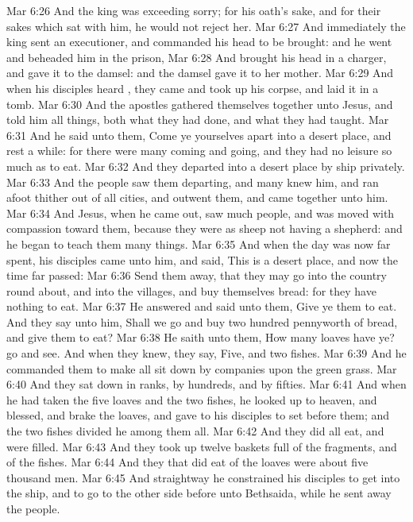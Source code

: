 \vs Mar 6:26 And the king was exceeding sorry;  for his oath's sake, and for their sakes which sat with him, he would not reject her.
\vs Mar 6:27 And immediately the king sent an executioner, and commanded his head to be brought: and he went and beheaded him in the prison,
\vs Mar 6:28 And brought his head in a charger, and gave it to the damsel: and the damsel gave it to her mother.
\vs Mar 6:29 And when his disciples heard , they came and took up his corpse, and laid it in a tomb.
\vs Mar 6:30 And the apostles gathered themselves together unto Jesus, and told him all things, both what they had done, and what they had taught.
\vs Mar 6:31 And he said unto them, Come ye yourselves apart into a desert place, and rest a while: for there were many coming and going, and they had no leisure so much as to eat.
\vs Mar 6:32 And they departed into a desert place by ship privately.
\vs Mar 6:33 And the people saw them departing, and many knew him, and ran afoot thither out of all cities, and outwent them, and came together unto him.
\vs Mar 6:34 And Jesus, when he came out, saw much people, and was moved with compassion toward them, because they were as sheep not having a shepherd: and he began to teach them many things.
\vs Mar 6:35 And when the day was now far spent, his disciples came unto him, and said, This is a desert place, and now the time  far passed:
\vs Mar 6:36 Send them away, that they may go into the country round about, and into the villages, and buy themselves bread: for they have nothing to eat.
\vs Mar 6:37 He answered and said unto them, Give ye them to eat. And they say unto him, Shall we go and buy two hundred pennyworth of bread, and give them to eat?
\vs Mar 6:38 He saith unto them, How many loaves have ye? go and see. And when they knew, they say, Five, and two fishes.
\vs Mar 6:39 And he commanded them to make all sit down by companies upon the green grass.
\vs Mar 6:40 And they sat down in ranks, by hundreds, and by fifties.
\vs Mar 6:41 And when he had taken the five loaves and the two fishes, he looked up to heaven, and blessed, and brake the loaves, and gave  to his disciples to set before them; and the two fishes divided he among them all.
\vs Mar 6:42 And they did all eat, and were filled.
\vs Mar 6:43 And they took up twelve baskets full of the fragments, and of the fishes.
\vs Mar 6:44 And they that did eat of the loaves were about five thousand men.
\vs Mar 6:45 And straightway he constrained his disciples to get into the ship, and to go to the other side before unto Bethsaida, while he sent away the people.
